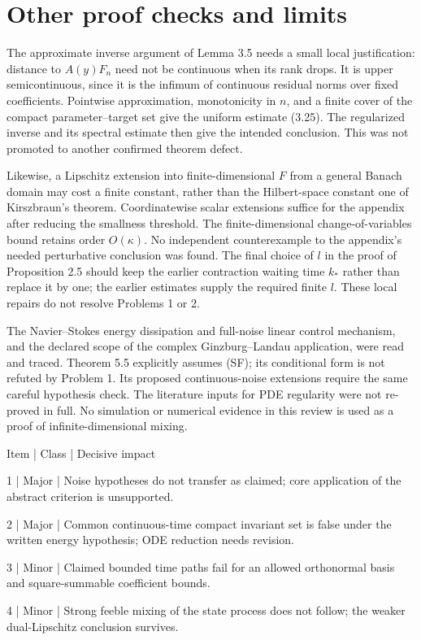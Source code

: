 \documentclass[10pt]{article}
\begin{document}
\section*{Other proof checks and limits}
The approximate inverse argument of Lemma 3.5 needs a small local justification: distance to \(A(y)F_n\) need not be continuous when its rank drops. It is upper semicontinuous, since it is the infimum of continuous residual norms over fixed coefficients. Pointwise approximation, monotonicity in \(n\), and a finite cover of the compact parameter–target set give the uniform estimate (3.25). The regularized inverse and its spectral estimate then give the intended conclusion. This was not promoted to another confirmed theorem defect.\par
Likewise, a Lipschitz extension into finite-dimensional \(F\) from a general Banach domain may cost a finite constant, rather than the Hilbert-space constant one of Kirszbraun’s theorem. Coordinatewise scalar extensions suffice for the appendix after reducing the smallness threshold. The finite-dimensional change-of-variables bound retains order \(O(\kappa)\). No independent counterexample to the appendix’s needed perturbative conclusion was found. The final choice of \(l\) in the proof of Proposition 2.5 should keep the earlier contraction waiting time \(k_*\) rather than replace it by one; the earlier estimates supply the required finite \(l\). These local repairs do not resolve Problems 1 or 2.\par
The Navier–Stokes energy dissipation and full-noise linear control mechanism, and the declared scope of the complex Ginzburg–Landau application, were read and traced. Theorem 5.5 explicitly assumes (SF); its conditional form is not refuted by Problem 1. Its proposed continuous-noise extensions require the same careful hypothesis check. The literature inputs for PDE regularity were not re-proved in full. No simulation or numerical evidence in this review is used as a proof of infinite-dimensional mixing.\par
Item | Class | Decisive impact\par
1 | Major | Noise hypotheses do not transfer as claimed; core application of the abstract criterion is unsupported.\par
2 | Major | Common continuous-time compact invariant set is false under the written energy hypothesis; ODE reduction needs revision.\par
3 | Minor | Claimed bounded time paths fail for an allowed orthonormal basis and square-summable coefficient bounds.\par
4 | Minor | Strong feeble mixing of the state process does not follow; the weaker dual-Lipschitz conclusion survives.\par
\end{document}
